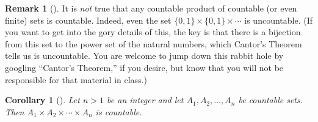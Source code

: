 \documentclass[10pt,]{book}
\theoremstyle{plain}
\newtheorem{corollary}[theorem]{Corollary}
\theoremstyle{definition}
\theoremstyle{definition}
\newtheorem{remark}[theorem]{Remark}
\theoremstyle{definition}
\theoremstyle{definition}
\numberwithin{equation}{section}
\begin{document}
\begin{remark}[]\label{remark-4}
It is \emph{not} true that any countable product of countable (or even finite) sets is countable. Indeed, even the set \(\{0,1\}\times \{0,1\}\times \cdots\) is uncountable. (If you want to get into the gory details of this, the key is that there is a bijection from this set to the power set of the natural numbers, which Cantor's Theorem tells us is uncountable.  You are welcome to jump down this rabbit hole by googling ``Cantor's Theorem,'' if you desire, but know that you will not be responsible for that material in class.)%
\end{remark}
\begin{corollary}[{}]\label{corollary-1}
Let \(n>1\) be an integer and let \(A_1,A_2,\ldots, A_n\) be countable sets. Then \(A_1\times A_2\times \cdots \times A_n\) is countable.%
\end{corollary}
\typeout{************************************************}
\typeout{************************************************}
\end{document}
